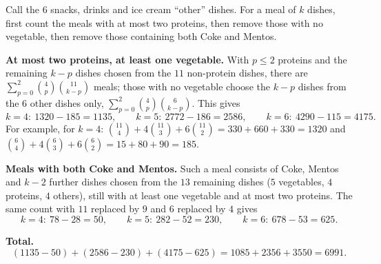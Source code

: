 Call the $6$ snacks, drinks and ice cream ``other'' dishes. For a meal of $k$ dishes, first count the meals with at most two proteins, then remove those with no vegetable, then remove those containing both Coke and Mentos.

\textbf{At most two proteins, at least one vegetable.} With $p\le2$ proteins and the remaining $k-p$ dishes chosen from the $11$ non-protein dishes, there are $\sum_{p=0}^{2}\binom4p\binom{11}{k-p}$ meals; those with no vegetable choose the $k-p$ dishes from the $6$ other dishes only, $\sum_{p=0}^{2}\binom4p\binom{6}{k-p}$. This gives
\[
k=4:\ 1320-185=1135,\qquad k=5:\ 2772-186=2586,\qquad k=6:\ 4290-115=4175 .
\]
For example, for $k=4$: $\binom{11}{4}+4\binom{11}{3}+6\binom{11}{2}=330+660+330=1320$ and $\binom64+4\binom63+6\binom62=15+80+90=185$.

\textbf{Meals with both Coke and Mentos.} Such a meal consists of Coke, Mentos and $k-2$ further dishes chosen from the $13$ remaining dishes ($5$ vegetables, $4$ proteins, $4$ others), still with at least one vegetable and at most two proteins. The same count with $11$ replaced by $9$ and $6$ replaced by $4$ gives
\[
k=4:\ 78-28=50,\qquad k=5:\ 282-52=230,\qquad k=6:\ 678-53=625 .
\]

\textbf{Total.}
\[
(1135-50)+(2586-230)+(4175-625)=1085+2356+3550=\boxed{6991}.
\]
